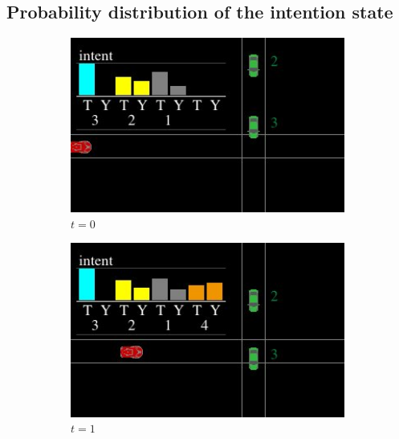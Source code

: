 \subsection{Probability distribution of the intention state}
\begin{figure}[!t]
    \begin{subfigure}[b]{0.24\textwidth}
         \centering
         \includegraphics[width=0.99\textwidth]{figures/intent_distribution/screenshot_2.jpeg}
         \caption{$t=0$}
     \end{subfigure}
     \hfill
     \begin{subfigure}[b]{0.24\textwidth}
         \centering
         \includegraphics[width=0.99\textwidth]{figures/intent_distribution/screenshot_3.jpeg}
         \caption{$t=1$}
     \end{subfigure}
     \hfill
     \begin{subfigure}[b]{0.24\textwidth}

\end{subfigure}
\end{figure}
